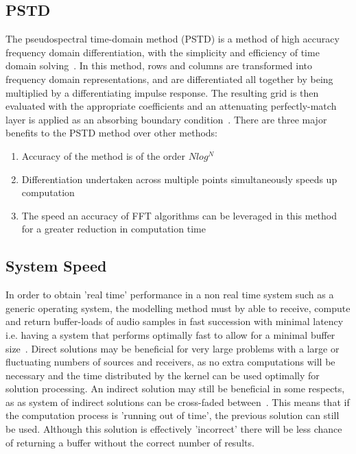 \documentclass{svproc}
\begin{document}
\subsection{PSTD}
The pseudospectral time-domain method (PSTD) is a method of high accuracy frequency domain differentiation, with the simplicity and efficiency of time domain solving~\cite{Hornikx2016}. In this method, rows and columns are transformed into frequency domain representations, and are differentiated all together by being multiplied by a differentiating impulse response. The resulting grid is then evaluated with the appropriate coefficients and an attenuating perfectly-match layer is applied as an absorbing boundary condition~\cite{Angus2010}. There are three major benefits to the PSTD method over other methods:
\begin{enumerate}
\item Accuracy of the method is of the order $Nlog^N$
\item Differentiation undertaken across multiple points simultaneously speeds up computation
\item The speed an accuracy of FFT algorithms can be leveraged in this method for a greater reduction in computation time
\end{enumerate}


\subsection{System Speed}
In order to obtain 'real time' performance in a non real time system such as a generic operating system, the modelling method must by able to receive, compute and return buffer-loads of audio samples in fast succession with minimal latency~\cite{Pirkle2013} i.e. having a system that performs optimally fast to allow for a minimal buffer size~\cite{Microsoft2016}. Direct solutions may be beneficial for very large problems with a large or fluctuating numbers of sources and receivers, as no extra computations will be necessary and the time distributed by the kernel can be used optimally for solution processing. An indirect solution may still be beneficial in some respects, as as system of indirect solutions can be cross-faded between~\cite{Galvez2016}. This means that if the computation process is 'running out of time', the previous solution can still be used. Although this solution is effectively 'incorrect' there will be less chance of returning a buffer without the correct number of results.
\end{document}

